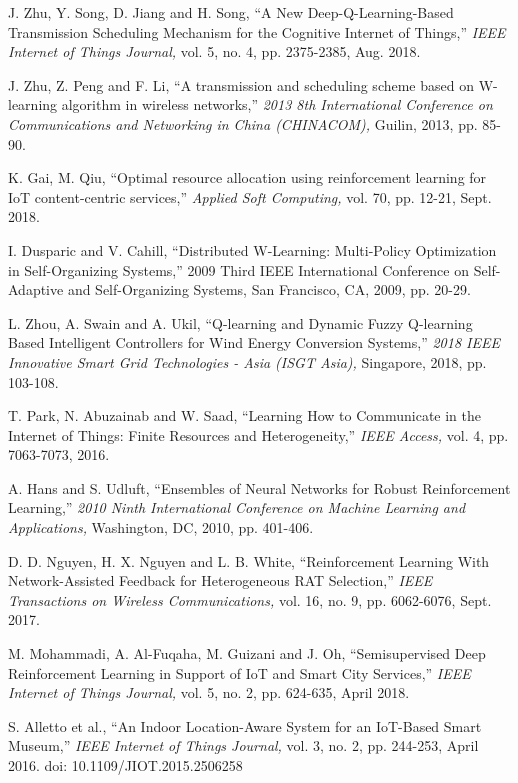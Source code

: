 \documentclass[journal]{IEEEtran}
\begin{document}
\begin{thebibliography}{1}
J. Zhu, Y. Song, D. Jiang and H. Song, ``A New Deep-Q-Learning-Based Transmission Scheduling Mechanism for the Cognitive Internet of Things,'' \emph{IEEE Internet of Things Journal,} vol. 5, no. 4, pp. 2375-2385, Aug. 2018.

J. Zhu, Z. Peng and F. Li, ``A transmission and scheduling scheme based on W-learning algorithm in wireless networks,'' \emph{2013 8th International Conference on Communications and Networking in China (CHINACOM),} Guilin, 2013, pp. 85-90.

K. Gai, M. Qiu, ``Optimal resource allocation using reinforcement learning for IoT content-centric services,'' \emph{Applied Soft Computing,} vol. 70,
pp. 12-21, Sept. 2018.

I. Dusparic and V. Cahill, ``Distributed W-Learning: Multi-Policy Optimization in Self-Organizing Systems,'' 2009 Third IEEE International Conference on Self-Adaptive and Self-Organizing Systems, San Francisco, CA, 2009, pp. 20-29.

L. Zhou, A. Swain and A. Ukil, ``Q-learning and Dynamic Fuzzy Q-learning Based Intelligent Controllers for Wind Energy Conversion Systems,'' \emph{2018 IEEE Innovative Smart Grid Technologies - Asia (ISGT Asia),} Singapore, 2018, pp. 103-108.

T. Park, N. Abuzainab and W. Saad, ``Learning How to Communicate in the Internet of Things: Finite Resources and Heterogeneity,'' \emph{IEEE Access,} vol. 4, pp. 7063-7073, 2016.

A. Hans and S. Udluft, ``Ensembles of Neural Networks for Robust Reinforcement Learning,'' \emph{2010 Ninth International Conference on Machine Learning and Applications,} Washington, DC, 2010, pp. 401-406.

D. D. Nguyen, H. X. Nguyen and L. B. White, ``Reinforcement Learning With Network-Assisted Feedback for Heterogeneous RAT Selection,'' \emph{IEEE Transactions on Wireless Communications,} vol. 16, no. 9, pp. 6062-6076, Sept. 2017.

M. Mohammadi, A. Al-Fuqaha, M. Guizani and J. Oh, ``Semisupervised Deep Reinforcement Learning in Support of IoT and Smart City Services,'' \emph{IEEE Internet of Things Journal,} vol. 5, no. 2, pp. 624-635, April 2018.

S. Alletto et al., ``An Indoor Location-Aware System for an IoT-Based Smart Museum,'' \emph{IEEE Internet of Things Journal,} vol. 3, no. 2, pp. 244-253, April 2016.
doi: 10.1109/JIOT.2015.2506258


\end{thebibliography}
\end{document}
